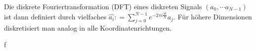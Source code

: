 Die diskrete Fouriertransformation (DFT) eines diskreten Signals $(a_0, \cdots a_{N-1})$ ist dann definiert durch vielfaches
$\hat{a_i} : = \sum_{j=0}^{N-1} e^{-2 \pi i \frac{jk}{N}} a_j$. 
Für höhere Dimensionen diskretisiert man analog in alle Koordinatenrichtungen. 

f%

